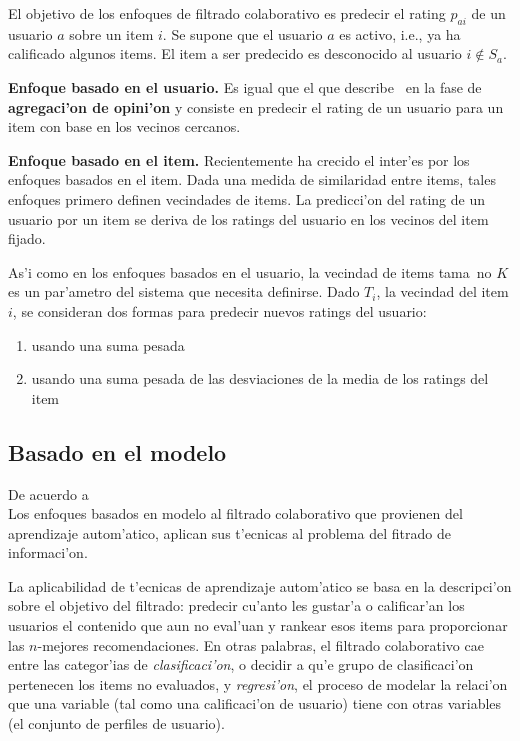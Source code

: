 \documentclass[11pt]{article}
\begin{document}
El objetivo de los enfoques de filtrado colaborativo es predecir el rating $p_{ai}$ de un usuario $a$ sobre un item $i$. Se supone que el usuario $a$ es activo, i.e., ya ha calificado algunos items. El item a ser predecido es desconocido al usuario $i \notin S_{a}$.

\smallskip
\textbf{Enfoque basado en el usuario.} Es igual que el que describe~\cite{recsys:nlathia} en la fase de \textbf{agregaci'on de opini'on} y consiste en predecir el rating de un usuario para un item con base en los vecinos cercanos.

\smallskip
\textbf{Enfoque basado en el item.} Recientemente ha crecido el inter'es por los enfoques basados en el item. Dada una medida de similaridad entre items, tales enfoques primero definen vecindades de items. La predicci'on del rating de un usuario por un item se deriva de los ratings del usuario en los vecinos del item fijado.

As'i como en los enfoques basados en el usuario, la vecindad de items tama~no $K$ es un par'ametro del sistema que necesita definirse. Dado $T_i$, la vecindad del item $i$, se consideran dos formas para predecir nuevos ratings del usuario:

\begin{enumerate}
\item usando una suma pesada
\item usando una suma pesada de las desviaciones de la media de los ratings del item
\end{enumerate}


\subsection{Basado en el modelo}
De acuerdo a~\cite{recsys:nlathia}\\
Los enfoques basados en modelo al filtrado colaborativo que provienen del aprendizaje autom'atico, aplican sus t'ecnicas al problema del fitrado de informaci'on.

La aplicabilidad de t'ecnicas de aprendizaje autom'atico se basa en la descripci'on sobre el objetivo del filtrado: predecir cu'anto les gustar'a o calificar'an los usuarios el contenido que aun no eval'uan y rankear esos items para proporcionar las $n$-mejores recomendaciones. En otras palabras, el filtrado colaborativo cae entre las categor'ias de \textit{clasificaci'on}, o decidir a qu'e grupo de clasificaci'on pertenecen los items no evaluados, y \textit{regresi'on}, el proceso de modelar la relaci'on que una variable (tal como una calificaci'on de usuario) tiene con otras variables (el conjunto de perfiles de usuario).
\end{document}
